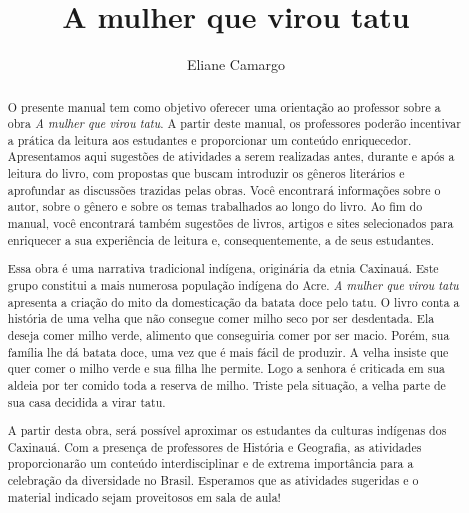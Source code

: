 \documentclass[11pt]{extarticle}
\newcommand{\AutorLivro}{Eliane Camargo}
\newcommand{\TituloLivro}{A mulher que virou tatu}
\newcommand{\colaborador}{Ana Lancman}
\begin{document}
\title{\TituloLivro}
\author{\AutorLivro}
\def\authornotes{\colaborador}

\date{}
\maketitle


\tableofcontents


\begin{abstract}

O presente manual tem como objetivo oferecer uma orientação ao professor sobre a obra \textit{A mulher que virou tatu}. A partir deste manual, os professores poderão incentivar a prática da leitura aos estudantes e proporcionar um conteúdo enriquecedor. Apresentamos aqui sugestões de atividades a serem realizadas antes, durante e após a leitura do livro, com propostas que buscam introduzir os gêneros literários e aprofundar as discussões trazidas pelas obras. Você encontrará informações sobre o autor, sobre o gênero e sobre os temas trabalhados ao longo do livro. Ao fim do manual, você encontrará também sugestões de livros, artigos e sites selecionados para enriquecer a sua experiência de leitura e, consequentemente, a de seus estudantes.

Essa obra é uma narrativa tradicional indígena, originária da etnia Caxinauá. Este grupo constitui a mais numerosa população indígena do Acre. \textit{A mulher que virou tatu} apresenta a criação do mito da domesticação da batata doce pelo tatu. O livro conta a história de uma velha que não consegue comer milho seco por ser desdentada. Ela deseja comer milho verde, alimento que conseguiria comer por ser macio. Porém, sua família lhe dá batata doce, uma vez que é mais fácil de produzir. A velha insiste que quer comer o milho verde e sua filha lhe permite. Logo a senhora é criticada em sua aldeia por ter comido toda a reserva de milho. Triste pela situação, a velha parte de sua casa decidida a virar tatu. 

A partir desta obra, será possível aproximar os estudantes da culturas indígenas dos Caxinauá. Com a presença de professores de História e Geografia, as atividades proporcionarão um conteúdo interdisciplinar e de extrema importância para a celebração da diversidade no Brasil. Esperamos que as atividades sugeridas e o material indicado sejam proveitosos em sala de aula! 

\end{abstract}
\end{document}
